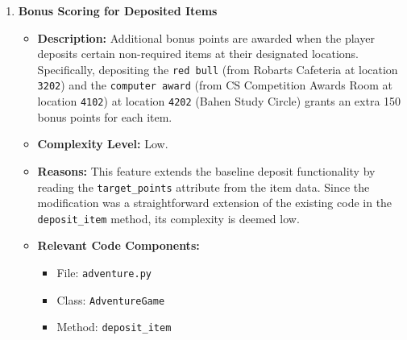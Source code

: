 \documentclass[11pt]{article}
\begin{document}
\begin{enumerate}
    \item \textbf{Bonus Scoring for Deposited Items}
    \begin{itemize}
        \item \textbf{Description:}  
        Additional bonus points are awarded when the player deposits certain non-required items at their designated locations. Specifically, depositing the \texttt{red bull} (from Robarts Cafeteria at location \texttt{3202}) and the \texttt{computer award} (from CS Competition Awards Room at location \texttt{4102}) at location \texttt{4202} (Bahen Study Circle) grants an extra 150 bonus points for each item.
        \item \textbf{Complexity Level:} Low.
        \item \textbf{Reasons:}  
        This feature extends the baseline deposit functionality by reading the \texttt{target\_points} attribute from the item data. Since the modification was a straightforward extension of the existing code in the \texttt{deposit\_item} method, its complexity is deemed low.
        \item \textbf{Relevant Code Components:}  
        \begin{itemize}
            \item File: \texttt{adventure.py}
            \item Class: \texttt{AdventureGame}
            \item Method: \texttt{deposit\_item}
        \end{itemize}
    \end{itemize}
    

\end{enumerate}
\end{document}
